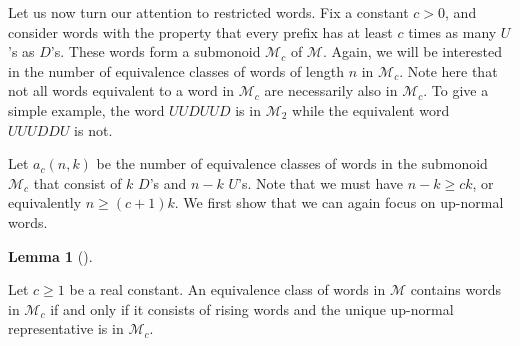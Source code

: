 \documentclass[numbers=enddot,12pt,final,onecolumn,notitlepage]{scrartcl}%
\theoremstyle{definition}
\newtheorem{lem}[theo]{Lemma}
\newenvironment{lemma}[1][]
{\begin{lem}[#1]\begin{leftbar}}
{\end{leftbar}\end{lem}}
\newcommand{\M}{\mathcal{M}}
\begin{document}
Let us now turn our attention to restricted words. Fix a constant $c > 0$, and consider words with the property that every prefix has at least $c$ times as many $U$'s as $D$'s. These words form a submonoid $\M_c$ of $\M$. Again, we will be interested in the number of equivalence classes of words of length $n$ in $\M_c$. Note here that not all words equivalent to a word in $\M_c$ are necessarily also in $\M_c$. To give a simple example, the word $UUDUUD$ is in $\M_2$ while the equivalent word $UUUDDU$ is not.

Let $a_c(n,k)$ be the number of equivalence classes of words in the submonoid $\M_c$ that consist of $k$ $D$'s and $n-k$ $U$'s. Note that we must have $n-k \geq ck$, or equivalently $n \geq (c+1)k$. We first show that we can again focus on up-normal words.

\begin{lemma}\label{lem:normal_form_only}
    Let $c \geq 1$ be a real constant. An equivalence class of words in $\M$ contains words in $\M_c$ if and only if it consists of rising words and the unique up-normal representative is in $\M_c$.
\end{lemma}
\end{document}
